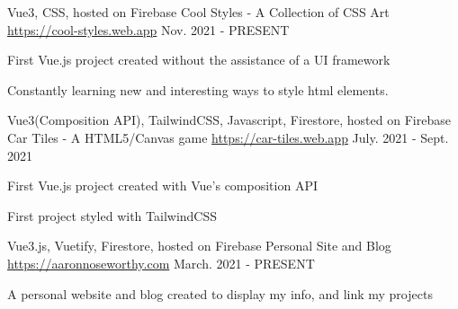 


\begin{cventries}


\cventry
{Vue3, CSS, hosted on Firebase} %
{Cool Styles - A Collection of CSS Art} %
{\href{https://cool-styles.web.app}{https://cool-styles.web.app}} %
{Nov. 2021 - PRESENT} %
{ %
\begin{cvitems}
\item {First Vue.js project created without the assistance of a UI framework}
\item {Constantly learning new and interesting ways to style html elements.}
\end{cvitems}
}


\cventry
{Vue3(Composition API), TailwindCSS, Javascript, Firestore, hosted on Firebase} %
{Car Tiles - A HTML5/Canvas game} %
{\href{https://car-tiles.web.app}{https://car-tiles.web.app}} %
{July. 2021 - Sept. 2021} %
{ %
\begin{cvitems}
\item {First Vue.js project created with Vue's composition API}
\item {First project styled with TailwindCSS}
\end{cvitems}
}


\cventry
{Vue3.js, Vuetify, Firestore, hosted on Firebase} %
{Personal Site and Blog} %
{\href{https://aaronnoseworthy.com}{https://aaronnoseworthy.com}} %
{March. 2021 - PRESENT} %
{ %
\begin{cvitems}
\item {A personal website and blog created to display my info, and link my projects}
\end{cvitems}
}


\end{cventries}
